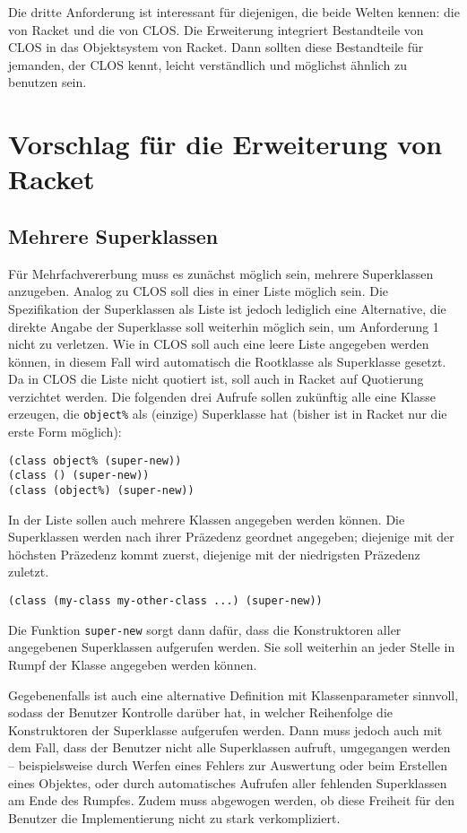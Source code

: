 Die dritte Anforderung ist interessant für diejenigen, die beide Welten kennen: die von Racket und die von CLOS. Die Erweiterung integriert Bestandteile von CLOS in das Objektsystem von Racket. Dann sollten diese Bestandteile für jemanden, der CLOS kennt, leicht verständlich und möglichst ähnlich zu benutzen sein.

\section{Vorschlag für die Erweiterung von Racket}

\subsection{Mehrere Superklassen}
Für Mehrfachvererbung muss es zunächst möglich sein, mehrere Superklassen anzugeben. Analog zu CLOS soll dies in einer Liste möglich sein. Die Spezifikation der Superklassen als Liste ist jedoch lediglich eine Alternative, die direkte Angabe der Superklasse soll weiterhin möglich sein, um Anforderung 1 nicht zu verletzen. Wie in CLOS soll auch eine leere Liste angegeben werden können, in diesem Fall wird automatisch die Rootklasse als Superklasse gesetzt. Da in CLOS die Liste nicht quotiert ist, soll auch in Racket auf Quotierung verzichtet werden. Die folgenden drei Aufrufe sollen zukünftig alle eine Klasse erzeugen, die \texttt{object\%} als (einzige) Superklasse hat (bisher ist in Racket nur die erste Form möglich):

\begin{lstlisting}
(class object% (super-new))
(class () (super-new))
(class (object%) (super-new))
\end{lstlisting}

In der Liste sollen auch mehrere Klassen angegeben werden können. Die Superklassen werden nach ihrer Präzedenz geordnet angegeben; diejenige mit der höchsten Präzedenz kommt zuerst, diejenige mit der niedrigsten Präzedenz zuletzt. 

\begin{lstlisting}
(class (my-class my-other-class ...) (super-new)) 
\end{lstlisting}

Die Funktion \texttt{super-new} sorgt dann dafür, dass die Konstruktoren aller angegebenen  Superklassen aufgerufen werden. Sie soll weiterhin an jeder Stelle in Rumpf der Klasse angegeben werden können. 

Gegebenenfalls ist auch eine alternative Definition mit Klassenparameter sinnvoll, sodass der Benutzer Kontrolle darüber hat, in welcher Reihenfolge die Konstruktoren der Superklasse aufgerufen werden. Dann muss jedoch auch mit dem Fall, dass der Benutzer nicht alle Superklassen aufruft, umgegangen werden -- beispielsweise durch Werfen eines Fehlers zur Auswertung oder beim Erstellen eines Objektes, oder durch automatisches Aufrufen aller fehlenden Superklassen am Ende des Rumpfes. Zudem muss abgewogen werden, ob diese Freiheit für den Benutzer die Implementierung nicht zu stark verkompliziert.

